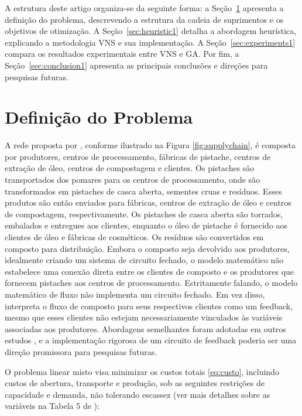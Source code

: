 \documentclass[a4paper]{ifacconf}
\begin{document}
A estrutura deste artigo organiza-se da seguinte forma: a Seção~\ref{sec:problem-def1} apresenta a definição do problema, descrevendo a estrutura da cadeia de suprimentos e os 
objetivos de otimização. A Seção~\ref{sec:heuristic1} detalha a abordagem heurística, explicando a metodologia VNS e sua implementação. A Seção~\ref{sec:experiments1} compara os 
resultados experimentais entre VNS e GA. Por fim, a Seção~\ref{sec:conclusion1} apresenta as principais conclusões e direções para pesquisas futuras.



\section{Definição do Problema}
\label{sec:problem-def1}

A rede proposta por \cite{rajabi2023utilizing}, conforme ilustrado na Figura \ref{fig:supplychain}, é composta por produtores, centros de processamento, fábricas de pistache, centros de extração de óleo, 
centros de compostagem e clientes. Os pistaches são transportados dos pomares para os centros de processamento, onde são transformados em pistaches de casca aberta, sementes cruas e resíduos. Esses produtos 
são então enviados para fábricas, centros de extração de óleo e centros de compostagem, respectivamente. Os pistaches de casca aberta são torrados, embalados e entregues aos clientes, enquanto o óleo de 
pistache é fornecido aos clientes de óleo e fábricas de cosméticos. Os resíduos são convertidos em composto para distribuição. Embora o composto seja devolvido aos produtores, idealmente criando um sistema 
de circuito fechado, o modelo matemático não estabelece uma conexão direta entre os clientes de composto e os produtores que fornecem pistaches aos centros de processamento. Estritamente falando, o modelo 
matemático de fluxo não implementa um circuito fechado. Em vez disso, interpreta o fluxo de composto para seus respectivos clientes como um feedback, mesmo que esses clientes não estejam necessariamente 
vinculados às variáveis associadas aos produtores. Abordagens semelhantes foram adotadas em outros estudos \citep{pishvaee2010memetic,ahmadi2019integrated,banasik2016simple}, e a implementação rigorosa de um 
circuito de feedback poderia ser uma direção promissora para pesquisas futuras. 

O problema linear misto visa minimizar os custos totais \eqref{eq:custo}, incluindo custos de abertura, transporte e produção, sob as seguintes restrições de capacidade e demanda, não tolerando escassez (ver
mais detalhes sobre as variáveis na Tabela 5 de \cite{rajabi2023utilizing}):
\end{document}
